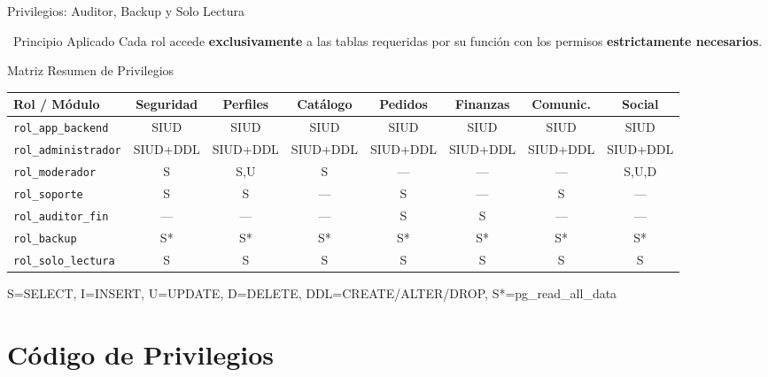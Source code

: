 \documentclass[aspectratio=169]{beamer}
\begin{document}
\begin{frame}{Privilegios: Auditor, Backup y Solo Lectura}
    \vspace{0.3cm}
    \centering
    \begin{exampleblock}{\faCheckCircle\ Principio Aplicado}
        Cada rol accede \textbf{exclusivamente} a las tablas requeridas por su función con los permisos \textbf{estrictamente necesarios}.
    \end{exampleblock}
\end{frame}

\begin{frame}{Matriz Resumen de Privilegios}
    \centering
    \scriptsize
    \begin{tabular}{l c c c c c c c}
        \toprule
        \textbf{Rol / Módulo} & \textbf{Seguridad} & \textbf{Perfiles} & \textbf{Catálogo} & \textbf{Pedidos} & \textbf{Finanzas} & \textbf{Comunic.} & \textbf{Social} \\
        \midrule
        \texttt{rol\_app\_backend}   & SIUD & SIUD & SIUD & SIUD & SIUD & SIUD & SIUD \\
        \texttt{rol\_administrador}  & SIUD+DDL & SIUD+DDL & SIUD+DDL & SIUD+DDL & SIUD+DDL & SIUD+DDL & SIUD+DDL \\
        \texttt{rol\_moderador}      & S & S,U & S & --- & --- & --- & S,U,D \\
        \texttt{rol\_soporte}        & S & S & --- & S & --- & S & --- \\
        \texttt{rol\_auditor\_fin}   & --- & --- & --- & S & S & --- & --- \\
        \texttt{rol\_backup}         & S* & S* & S* & S* & S* & S* & S* \\
        \texttt{rol\_solo\_lectura}  & S & S & S & S & S & S & S \\
        \bottomrule
    \end{tabular}

    \vspace{0.2cm}
    \tiny S=SELECT, I=INSERT, U=UPDATE, D=DELETE, DDL=CREATE/ALTER/DROP, S*=pg\_read\_all\_data
\end{frame}

\section{Código de Privilegios}
\end{document}
